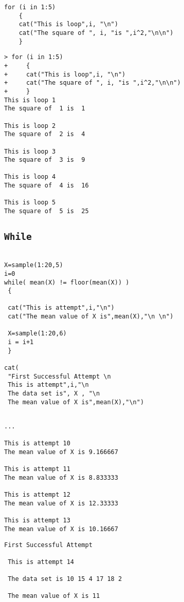 \documentclass[12pt]{article} %
\begin{document}
\begin{framed}
\begin{verbatim}
for (i in 1:5)
    {
    cat("This is loop",i, "\n")
    cat("The square of ", i, "is ",i^2,"\n\n")
    }
\end{verbatim}
\end{framed}


\begin{verbatim}
> for (i in 1:5)
+     {
+     cat("This is loop",i, "\n")
+     cat("The square of ", i, "is ",i^2,"\n\n")
+     }
This is loop 1 
The square of  1 is  1 

This is loop 2 
The square of  2 is  4 

This is loop 3 
The square of  3 is  9 

This is loop 4 
The square of  4 is  16 

This is loop 5 
The square of  5 is  25 
\end{verbatim}

\subsection{\texttt{While}}

\begin{framed}
\begin{verbatim}

X=sample(1:20,5)
i=0
while( mean(X) != floor(mean(X)) )
 {
 
 cat("This is attempt",i,"\n")
 cat("The mean value of X is",mean(X),"\n \n")

 X=sample(1:20,6)
 i = i+1
 }

cat(
 "First Successful Attempt \n 
 This is attempt",i,"\n
 The data set is", X , "\n
 The mean value of X is",mean(X),"\n")


\end{verbatim}
\end{framed}

\begin{verbatim}
...

This is attempt 10 
The mean value of X is 9.166667 
 
This is attempt 11 
The mean value of X is 8.833333 
 
This is attempt 12 
The mean value of X is 12.33333 
 
This is attempt 13 
The mean value of X is 10.16667 
\end{verbatim}
\begin{verbatim}
First Successful Attempt 
 
 This is attempt 14 

 The data set is 10 15 4 17 18 2 

 The mean value of X is 11 

\end{verbatim}
\end{document}

